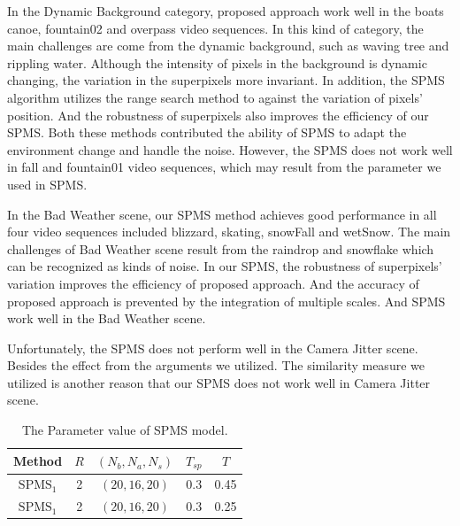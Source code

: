 \documentclass[runningheads,a4paper]{llncs}
\begin{document}
In the Dynamic Background category, proposed approach work well in the boats
canoe, fountain02 and overpass video sequences.
In this kind of category, the main challenges are come from the dynamic
background, such as waving tree and rippling water.
Although the intensity of pixels in the background is dynamic changing, the variation in the superpixels more
invariant.
In addition, the SPMS algorithm utilizes the range search method to against the
variation of pixels' position.
% 
And the robustness of superpixels also improves the efficiency of our
SPMS.
Both these methods contributed the ability of SPMS to adapt the environment change and handle the noise.
% 
However, the SPMS does not work well in fall and fountain01 video
sequences, which may result from the parameter we used in SPMS.

In the Bad Weather scene, our SPMS method achieves good performance in
all four video sequences included blizzard, skating, snowFall and
wetSnow.
The main challenges of Bad Weather scene result from the raindrop and snowflake which
can be recognized as kinds of noise.
In our SPMS, the robustness of superpixels' variation
improves the efficiency of proposed approach.
% 
And the accuracy of proposed approach is prevented by the integration of
multiple scales.
%
And SPMS work well in the Bad Weather scene.

Unfortunately, the SPMS does not perform well in the Camera Jitter
scene. Besides the effect from the arguments we utilized. The similarity
measure we utilized is another reason that our SPMS does not work well
in Camera Jitter scene.

\begin{table}[!t]			%
\caption{The Parameter value of SPMS model.}
\label{tab_para}				%
\centering
\begin{tabular*}{0.6\textwidth}{@{\extracolsep{\fill}}ccccc}
\hline
    Method      & $R$ & $(N_{b},N_{a},N_{s})$  & $T_{sp}$   & $T$ \\
\hline
    $\text{SPMS}_1$ & 2   & $(20,16,20)$    &   0.3      & 0.45 \\
    $\text{SPMS}_1$ & 2   & $(20,16,20)$     &      0.3   & 0.25 \\
\hline
\end{tabular*}
\end{table}
\end{document}
